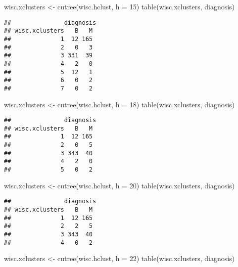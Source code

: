 \documentclass[
]{article}
\newenvironment{Shaded}{\begin{snugshade}}{\end{snugshade}}
\newcommand{\AttributeTok}[1]{\textcolor[rgb]{0.77,0.63,0.00}{#1}}
\newcommand{\DecValTok}[1]{\textcolor[rgb]{0.00,0.00,0.81}{#1}}
\newcommand{\FunctionTok}[1]{\textcolor[rgb]{0.00,0.00,0.00}{#1}}
\newcommand{\NormalTok}[1]{#1}
\newcommand{\OtherTok}[1]{\textcolor[rgb]{0.56,0.35,0.01}{#1}}
\begin{document}
\begin{Shaded}
\begin{Highlighting}[]
\NormalTok{wisc.xclusters }\OtherTok{\textless{}{-}} \FunctionTok{cutree}\NormalTok{(wisc.hclust, }\AttributeTok{h =} \DecValTok{15}\NormalTok{)}
\FunctionTok{table}\NormalTok{(wisc.xclusters, diagnosis)}
\end{Highlighting}
\end{Shaded}

\begin{verbatim}
##               diagnosis
## wisc.xclusters   B   M
##              1  12 165
##              2   0   3
##              3 331  39
##              4   2   0
##              5  12   1
##              6   0   2
##              7   0   2
\end{verbatim}

\begin{Shaded}
\begin{Highlighting}[]
\NormalTok{wisc.xclusters }\OtherTok{\textless{}{-}} \FunctionTok{cutree}\NormalTok{(wisc.hclust, }\AttributeTok{h =} \DecValTok{18}\NormalTok{)}
\FunctionTok{table}\NormalTok{(wisc.xclusters, diagnosis)}
\end{Highlighting}
\end{Shaded}

\begin{verbatim}
##               diagnosis
## wisc.xclusters   B   M
##              1  12 165
##              2   0   5
##              3 343  40
##              4   2   0
##              5   0   2
\end{verbatim}

\begin{Shaded}
\begin{Highlighting}[]
\NormalTok{wisc.xclusters }\OtherTok{\textless{}{-}} \FunctionTok{cutree}\NormalTok{(wisc.hclust, }\AttributeTok{h =} \DecValTok{20}\NormalTok{)}
\FunctionTok{table}\NormalTok{(wisc.xclusters, diagnosis)}
\end{Highlighting}
\end{Shaded}

\begin{verbatim}
##               diagnosis
## wisc.xclusters   B   M
##              1  12 165
##              2   2   5
##              3 343  40
##              4   0   2
\end{verbatim}

\begin{Shaded}
\begin{Highlighting}[]
\NormalTok{wisc.xclusters }\OtherTok{\textless{}{-}} \FunctionTok{cutree}\NormalTok{(wisc.hclust, }\AttributeTok{h =} \DecValTok{22}\NormalTok{)}
\FunctionTok{table}\NormalTok{(wisc.xclusters, diagnosis)}
\end{Highlighting}
\end{Shaded}
\end{document}
